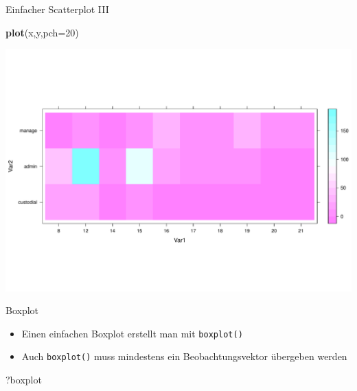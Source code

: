 \documentclass[ignorenonframetext,]{beamer}
\newenvironment{Shaded}{}{}
\newcommand{\KeywordTok}[1]{\textcolor[rgb]{0.00,0.44,0.13}{\textbf{{#1}}}}
\newcommand{\DataTypeTok}[1]{\textcolor[rgb]{0.56,0.13,0.00}{{#1}}}
\newcommand{\DecValTok}[1]{\textcolor[rgb]{0.25,0.63,0.44}{{#1}}}
\newcommand{\NormalTok}[1]{{#1}}
\providecommand{\tightlist}{%
\setlength{\itemsep}{0pt}\setlength{\parskip}{0pt}}
\begin{document}
\begin{frame}[fragile]{Einfacher Scatterplot III}

\begin{Shaded}
\begin{Highlighting}[]
\KeywordTok{plot}\NormalTok{(x,y,}\DataTypeTok{pch=}\DecValTok{20}\NormalTok{)}
\end{Highlighting}
\end{Shaded}

\includegraphics{R_intern_files/figure-beamer/unnamed-chunk-212-1.pdf}

\end{frame}

\begin{frame}[fragile]{Boxplot}

\begin{itemize}
\tightlist
\item
  Einen einfachen Boxplot erstellt man mit \texttt{boxplot()}
\item
  Auch \texttt{boxplot()} muss mindestens ein Beobachtungsvektor
  übergeben werden
\end{itemize}

\begin{Shaded}
\begin{Highlighting}[]
\NormalTok{?boxplot}
\end{Highlighting}
\end{Shaded}

\end{frame}
\end{document}
